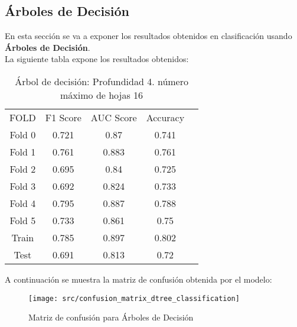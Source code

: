 \subsection{Árboles de Decisión}
En esta sección se va a exponer los resultados obtenidos en clasificación usando  \textbf{Árboles de Decisión}.\\
La siguiente tabla expone los resultados obtenidos:
\begin{table}[H]
	\centering
	\begin{tabular}{|c|c|c|c|c}
		\cline{1-4}
	    FOLD & F1 Score & AUC Score & Accuracy  \\ \cline{1-4}
	    Fold 0 & 0.721 & 0.87 & 0.741 \\ \cline{1-4}
	    Fold 1 & 0.761 & 0.883 & 0.761 \\ \cline{1-4}
	    Fold 2 & 0.695 & 0.84 & 0.725 \\ \cline{1-4}
	    Fold 3 & 0.692 & 0.824 & 0.733 \\ \cline{1-4}
	    Fold 4 & 0.795 & 0.887 & 0.788 \\ \cline{1-4}
	    Fold 5 & 0.733 & 0.861 & 0.75 \\ \cline{1-4}
	    Train & 0.785 & 0.897 & 0.802 \\ \cline{1-4}
	    Test & 0.691 & 0.813 & 0.72 \\ \cline{1-4}
	\end{tabular}
	\caption{Árbol de decisión:  Profundidad 4. número máximo de hojas 16}
	\label{tab:dtree_class_res}
\end{table}
A continuación se muestra la matriz de confusión obtenida por el modelo:
 \begin{figure}[H]
	\centering
	\texttt{[image: src/confusion\_matrix\_dtree\_classification]}
	\caption{Matriz de confusión para Árboles de Decisión}
	\label{fig:confusion_matrix_dtree}
\end{figure}

